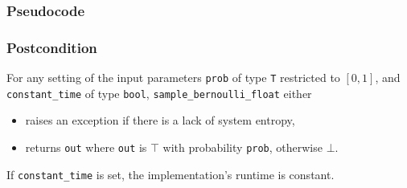\documentclass{article}
\begin{document}
\subsubsection*{Pseudocode}



\subsubsection*{Postcondition}

\begin{definition}
    \label{sample-bernoulli}
    For any setting of the input parameters
    \texttt{prob} of type \texttt{T} restricted to $[0, 1]$,
    and \texttt{constant\_time} of type \texttt{bool},
    \texttt{sample\_bernoulli\_float} either
    \begin{itemize}
        \item raises an exception if there is a lack of system entropy,
        \item returns \texttt{out} where \texttt{out} is $\top$ with probability \texttt{prob}, otherwise $\bot$.
    \end{itemize}
     If \texttt{constant\_time} is set, the implementation's runtime is constant.    
\end{definition}
\end{document}
